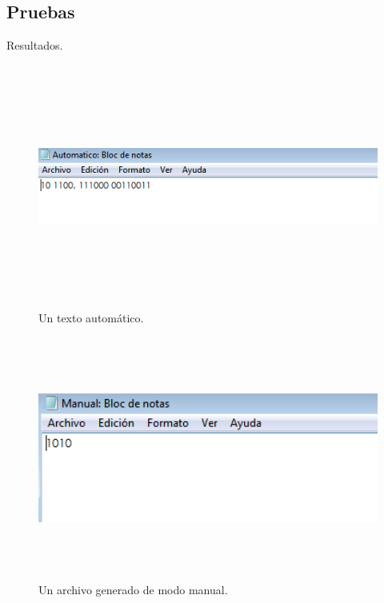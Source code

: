 \documentclass[12pt]{article}
\begin{document}
\vspace{1em}


\subsection{Pruebas}
Resultados.

\begin{figure}[H]
\includegraphics[width=\textwidth, height=8cm]{partxtauto}
\caption{Un texto automático.}
\label{fig:autómata paridad}
\end{figure}

\begin{figure}[H]
\includegraphics[width=\textwidth, height=8cm]{partxtman}
\caption{Un archivo generado de modo manual.}
\label{fig:autómata paridad}
\end{figure}
\end{document}
